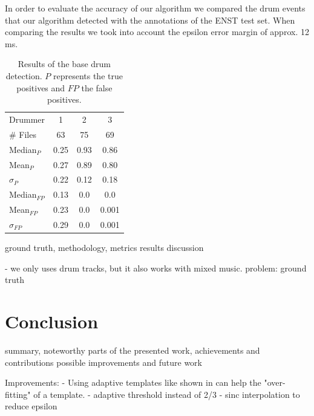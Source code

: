 \documentclass{article}
\begin{document}
In order to evaluate the accuracy of our algorithm we compared the drum events that our algorithm detected with the annotations of the ENST test set.
When comparing the results we took into account the epsilon error margin of approx. 12 ms.


  \begin{table}[h]
    \centering
    \begin{tabular}{l | c c c}
      Drummer  &  1 & 2 & 3 \\
      \# Files &   63 &   75 & 69 \\
      \hline
      Median$_{P}$   & 0.25 & 0.93 & 0.86 \\
      Mean$_{P}$     & 0.27 & 0.89 & 0.80 \\
      $\sigma_P$     & 0.22 & 0.12 & 0.18 \\
      \hline
      Median$_{FP}$   & 0.13 & 0.0 & 0.0 \\
      Mean$_{FP}$     & 0.23 & 0.0 & 0.001 \\
      $\sigma_{FP}$   & 0.29 & 0.0 & 0.001 \\
    \end{tabular}
    \caption{Results of the base drum detection. $P$ represents the true positives and $FP$ the false positives.}
    \label{tab:results}
  \end{table}

ground truth, methodology, metrics
results
discussion

- we only uses drum tracks, but it also works with mixed music. problem: ground truth



\section{Conclusion}
\label{sec:conclusion}

summary, noteworthy parts of the presented work,
achievements and contributions
possible improvements and future work

Improvements: 
- Using adaptive templates like shown in \cite{lerch2015} can help the "over-fitting" of a template.
- adaptive threshold instead of 2/3
- sinc interpolation to reduce epsilon




\end{document}
